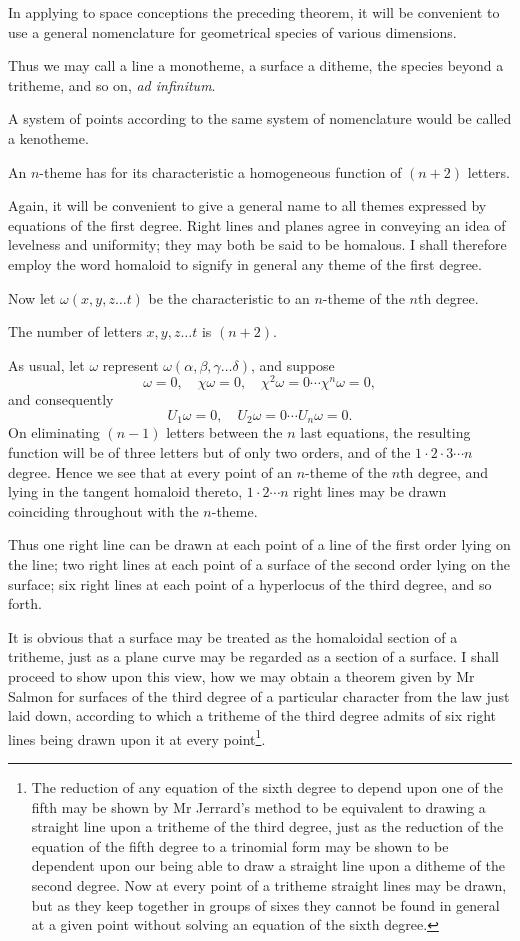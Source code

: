 \documentclass[11pt]{article}
\newcommand{\sourcepage}[1]{\marginpar{\scriptsize p.~#1}}
\begin{document}
{{In applying to space conceptions the preceding theorem, it will be convenient to use a general nomenclature for geometrical species of various dimensions.

Thus we may call a line a monotheme, a surface a ditheme, the species beyond a tritheme, and so on, \emph{ad infinitum}.

A system of points according to the same system of nomenclature would be called a kenotheme.

An $n$-theme has for its characteristic a homogeneous function of $(n+2)$ letters.

Again, it will be convenient to give a general name to all themes expressed by equations of the first degree. Right lines and planes agree in conveying an idea of levelness and uniformity; they may both be said to be homalous. I shall therefore employ the word homaloid to signify in general any theme of the first degree.

Now let $\omega(x,y,z\ldots t)$ be the characteristic to an $n$-theme of the $n$th degree.

The number of letters $x,y,z\ldots t$ is $(n+2)$.

As usual, let $\omega$ represent $\omega(\alpha,\beta,\gamma\ldots\delta)$, and suppose
\[
 \omega=0,\quad \chi\omega=0,
 \quad \chi^2\omega=0\cdots \chi^n\omega=0,
\]
and consequently
\[
 U_1\omega=0,
 \quad U_2\omega=0\cdots U_n\omega=0.
\]
On eliminating $(n-1)$ letters between the $n$ last equations, the resulting function will be of three letters but of only two orders, and of the $1\cdot2\cdot3\cdots n$ degree. Hence we see that at every point of an $n$-theme of the $n$th degree, \sourcepage{176} and lying in the tangent homaloid thereto, $1\cdot2\cdots n$ right lines may be drawn coinciding throughout with the $n$-theme.

Thus one right line can be drawn at each point of a line of the first order lying on the line; two right lines at each point of a surface of the second order lying on the surface; six right lines at each point of a hyperlocus of the third degree, and so forth.

It is obvious that a surface may be treated as the homaloidal section of a tritheme, just as a plane curve may be regarded as a section of a surface. I shall proceed to show upon this view, how we may obtain a theorem given by Mr Salmon for surfaces of the third degree of a particular character from the law just laid down, according to which a tritheme of the third degree admits of six right lines being drawn upon it at every point\footnote{The reduction of any equation of the sixth degree to depend upon one of the fifth may be shown by Mr Jerrard's method to be equivalent to drawing a straight line upon a tritheme of the third degree, just as the reduction of the equation of the fifth degree to a trinomial form may be shown to be dependent upon our being able to draw a straight line upon a ditheme of the second degree. Now at every point of a tritheme straight lines may be drawn, but as they keep together in groups of sixes they cannot be found in general at a given point without solving an equation of the sixth degree.}.

}}
\end{document}
